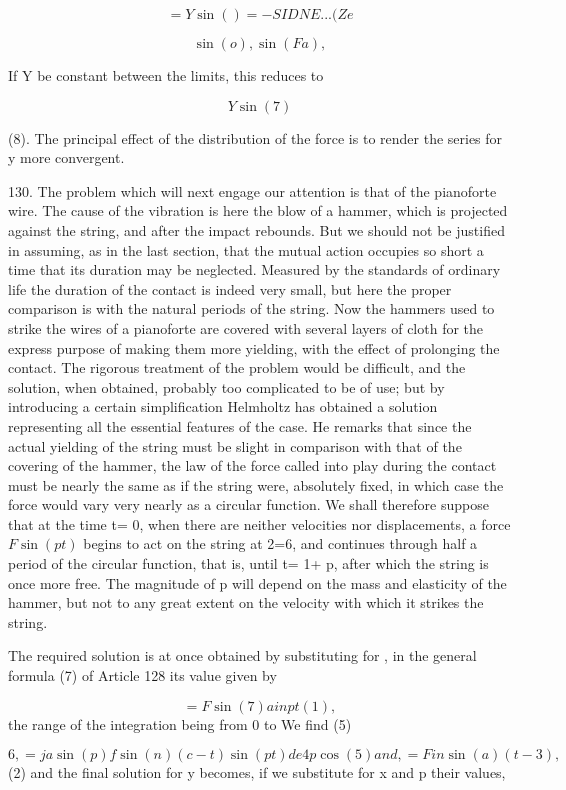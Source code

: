 \[= Y \sin()=- SID NE. ..(Ze\]

\[\sin(o), \sin(Fa),\]

If Y be constant between the limits, this reduces to

\[Y \sin(7)\]

(8). The principal effect of the distribution of the force is to render the
series for y more convergent.


130. The problem which will next engage our attention is that of the pianoforte
wire. The cause of the vibration is here the blow of a hammer, which is
projected against the string, and after the impact rebounds. But we should not
be justified in assuming, as in the last section, that the mutual action
occupies so short a time that its duration may be neglected. Measured by the
standards of ordinary life the duration of the contact is indeed very small,
but here the proper comparison is with the natural periods of the string. Now
the hammers used to strike the wires of a pianoforte are covered with several
layers of cloth for the express purpose of making them more yielding, with the
effect of prolonging the contact. The rigorous treatment of the problem would
be difficult, and the solution, when obtained, probably too complicated to be
of use; but by introducing a certain simplification Helmholtz has obtained a
solution representing all the essential features of the case. He remarks that
since the actual yielding of the string must be slight in comparison with that
of the covering of the hammer, the law of the force called into play during the
contact must be nearly the same as if the string were, absolutely fixed, in
which case the force would vary very nearly as a circular function. We shall
therefore suppose that at the time t= 0, when there are neither velocities nor
displacements, a force \(F \sin(pt)\) begins to act on the string at 2=6, and
continues through half a period of the circular function, that is, until t= 1+
p, after which the string is once more free. The magnitude of p will depend on
the mass and elasticity of the hammer, but not to any great extent on the
velocity with which it strikes the string.

The required solution is at once obtained by substituting for , in the general
formula (7) of Article 128 its value given by

\[= F \sin(7) a i n pt (1),\]
the range of the integration being from 0 to We
find (5)

\[6,=ja \sin(p) f \sin(n) (c-t) \sin(pt)de 4p \cos(5) and , = Fin \sin(a) (t- 3) ,\]
(2) and the final solution for y becomes, if we substitute for x and p their values,

